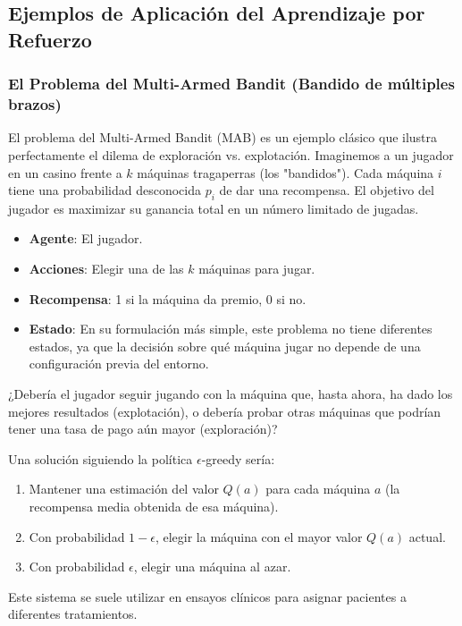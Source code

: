\documentclass[12pt,a4paper]{book}
\begin{document}
\subsection{Ejemplos de Aplicación del Aprendizaje por Refuerzo}

\subsubsection{El Problema del Multi-Armed Bandit (Bandido de múltiples brazos)}

El problema del Multi-Armed Bandit (MAB) \cite{MAB} es un ejemplo clásico que ilustra perfectamente el dilema de exploración vs. explotación. Imaginemos a un jugador en un casino frente a $k$ máquinas tragaperras (los "bandidos"). Cada máquina $i$ tiene una probabilidad desconocida $p_i$ de dar una recompensa. El objetivo del jugador es maximizar su ganancia total en un número limitado de jugadas.

\begin{itemize}
    \item \textbf{Agente}: El jugador.
    \item \textbf{Acciones}: Elegir una de las $k$ máquinas para jugar.
    \item \textbf{Recompensa}: 1 si la máquina da premio, 0 si no.
    \item \textbf{Estado}: En su formulación más simple, este problema no tiene diferentes estados, ya que la decisión sobre qué máquina jugar no depende de una configuración previa del entorno.
\end{itemize}

¿Debería el jugador seguir jugando con la máquina que, hasta ahora, ha dado los mejores resultados (explotación), o debería probar otras máquinas que podrían tener una tasa de pago aún mayor (exploración)?

Una solución siguiendo la política $\epsilon$-greedy sería:
\begin{enumerate}
    \item Mantener una estimación del valor $Q(a)$ para cada máquina $a$ (la recompensa media obtenida de esa máquina).
    \item Con probabilidad $1-\epsilon$, elegir la máquina con el mayor valor $Q(a)$ actual.
    \item Con probabilidad $\epsilon$, elegir una máquina al azar.
\end{enumerate}

Este sistema se suele utilizar en ensayos clínicos para asignar pacientes a diferentes tratamientos.
\end{document}
